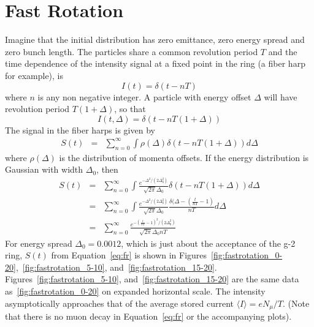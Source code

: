 \documentclass[10pt]{report}
\begin{document}

\section*{Fast Rotation}
Imagine that the initial distribution has zero emittance, zero energy spread and zero bunch length.
The particles share a common revolution period $T$ and the time dependence of the intensity signal
at a fixed point in the ring (a fiber harp for example), is $$I(t) = \delta(t-nT)$$
where $n$ is any non negative integer. A particle with energy offset $\Delta$ will have revolution period $T(1+\Delta)$, so that
$$I(t,\Delta) = \delta(t-nT(1+\Delta))$$
The signal in the fiber harps is given by
\begin{eqnarray*}
S(t) &=& \sum_{n=0}^\infty \int \rho(\Delta) \delta(t-nT(1+\Delta)) d\Delta
\end{eqnarray*}
where $\rho(\Delta)$ is the distribution of momenta offsets. If the energy distribution is Gaussian with width $\Delta_0$, then
\begin{eqnarray}
S(t)&=& \sum_{n=0}^\infty \int \frac{e^{-\Delta^2/(2\Delta_0^2)}}{\sqrt{2\pi}\Delta_0} \delta(t-nT(1+\Delta)) d\Delta\nonumber\\
&=& \sum_{n=0}^\infty \int \frac{e^{-\Delta^2/(2\Delta_0^2)}}{\sqrt{2\pi}\Delta_0} \frac{\delta(\Delta-(\frac{t}{nT}-1)}{nT} d\Delta\nonumber\\
&=& \sum_{n=0}^\infty\frac{e^{-(\frac{t}{nT}-1)^2/(2\Delta_0^2)}}{\sqrt{2\pi}\Delta_0 nT}\label{eq:fr}
\end{eqnarray}
For energy spread $\Delta_0= 0.0012$, which is just about the acceptance of the g-2 ring, $S(t)$ from Equation~\ref{eq:fr} is shown
in Figures~\ref{fig:fastrotation_0-20},~\ref{fig:fastrotation_5-10}, and~\ref{fig:fastrotation_15-20}. 
Figures~\ref{fig:fastrotation_5-10}, and~\ref{fig:fastrotation_15-20} are the same data as~\ref{fig:fastrotation_0-20} on expanded horizontal scale.
The intensity asymptotically approaches that of the average stored current $\langle I\rangle = eN_\mu /T$.
(Note that there is no muon decay in Equation~\ref{eq:fr} or the accompanying plots).
\end{document}
